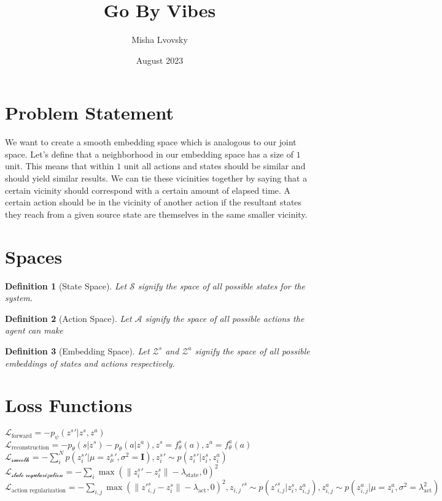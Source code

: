 \documentclass{article}
\title{Go By Vibes}
\author{Misha Lvovsky}
\date{August 2023}
\newtheorem{definition}{Definition}
\begin{document}
\maketitle

\section{Problem Statement}

We want to create a smooth embedding space which is analogous to our joint space.
Let's define that a neighborhood in our embedding space has a size of $1$ unit. This means that within $1$ unit all actions and states should be similar and should yield similar results. We can tie these vicinities together by saying that a certain vicinity should correspond with a certain amount of elapsed time. A certain action should be in the vicinity of another action if the resultant states they reach from a given source state are themselves in the same smaller vicinity.

\section{Spaces}

\begin{definition} [State Space] Let $\mathcal{S}$ signify the space of all possible states for the system.
\end{definition}
\begin{definition} [Action Space]
    Let $\mathcal{A}$ signify the space of all possible actions the agent can make
\end{definition}
\begin{definition} [Embedding Space]
    Let $\mathcal{Z}^s$ and $\mathcal{Z}^a$ signify the space of all possible embeddings of states and actions respectively.
\end{definition}

\section{Loss Functions}

$\mathcal{L}_\text{forward} = -p_\psi({z^s}'|z^s,z^a)$ \\
$\mathcal{L}_\text{reconstruction} = -p_\theta(s|z^s) - p_\theta(a|z^a), z^s = f^s_\theta(a), z^a = f^a_\theta(a)$ \\
$\mathcal{L_\text{smooth}}= -\sum\limits_i^N p({z^s_i}'|\mu={z^s_\mu}',\sigma^2=\mathbf{I}), {z^s_i}' \sim p({z^s_i}'|z^s_i,z^a_i)$ \\
$\mathcal{L_\text{state regularization}}=-\sum\limits_i\max(\|{z_i^s}'-z_i^s\|-\lambda_\text{state}, 0)^2$ \\
$\mathcal{L}_\text{action regularization}=-\sum\limits_{i,j} \max(\|z'^s_{i,j}-z^s_i\| - \lambda_\text{act}, 0)^2, z_{i,j}'^s\sim p(z'^s_{i,j}|z^s_i,z^a_{i,j}),z^a_{i,j}\sim p(z^a_{i,j}|\mu=z^a_i, \sigma^2=\lambda_\text{act}^2)$
\end{document}
